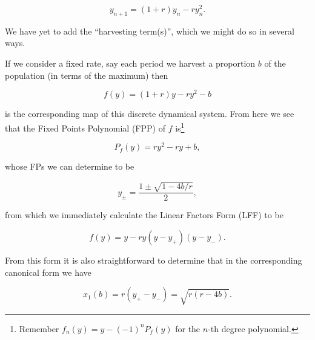 \documentclass[10pt,twoside,titlepage]{book}
\numberwithin{equation}{chapter}
\numberwithin{figure}{chapter}
\numberwithin{table}{chapter}
\theoremstyle{plain}%
\theoremstyle{definition}
\theoremstyle{remark}
\begin{document}
\begin{equation}\label{eq:harvestmod}
	y_{n+1}=(1+r)y_n-ry_n^2.
\end{equation}

We have yet to add the ``harvesting term(s)'', which we might do so in several ways.


If we consider a fixed rate, say each period we harvest a proportion $b$  of the population (in terms of the maximum) then

\begin{equation}
	f(y)=(1+r)y-ry^2-b%
\end{equation}

is the corresponding map of this discrete dynamical system. From here we see that the Fixed Points Polynomial (FPP) of $f$ is\footnote{Remember $f_n(y)=y-(-1)^nP_f(y)$ for the $n$-th degree polynomial.}

\[
P_f(y)=ry^2-ry+b,
\]

whose FPs we can determine to be

\[
y_\pm=\frac{1\pm\sqrt{1-4b/r}}{2},
\]

from which we immediately calculate the Linear Factors Form (LFF) to be

\begin{equation}
	f(y)=y-ry(y-y_+)(y-y_-).
\end{equation}

From this form it is also straightforward to determine that in the corresponding canonical form we have

\[
x_1(b)=r(y_+-y_-)=\sqrt{r(r-4b)}.
\]
\end{document}
